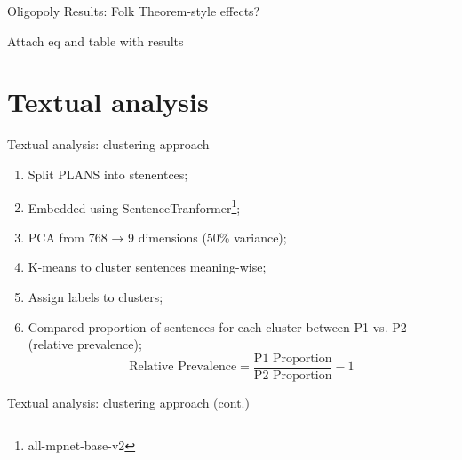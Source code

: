\documentclass[10pt, aspectratio=169]{beamer}
\begin{document}
\begin{frame}{Oligopoly Results: Folk Theorem-style effects?}

Attach eq and table with results
    
\end{frame}

\section{Textual analysis}


\begin{frame}[fragile]{Textual analysis: clustering approach}

\begin{enumerate}
    \item Split PLANS into stenentces;
    \item Embedded using SentenceTranformer\footnote{all-mpnet-base-v2};
    \item PCA from 768 → 9 dimensions (50\% variance);
    \item K-means to cluster sentences meaning-wise;
    \item Assign labels to clusters;
    \item Compared proportion of sentences for each cluster between P1 vs. P2 (relative prevalence);
    $$
    \text{Relative Prevalence} = \frac{\text{P1 Proportion}}{\text{P2 Proportion}} - 1
    $$
\end{enumerate}

\begin{itemize}
    

\end{itemize}

\end{frame}
\begin{frame}[fragile]{Textual analysis: clustering approach (cont.)}



\end{frame}
\end{document}

